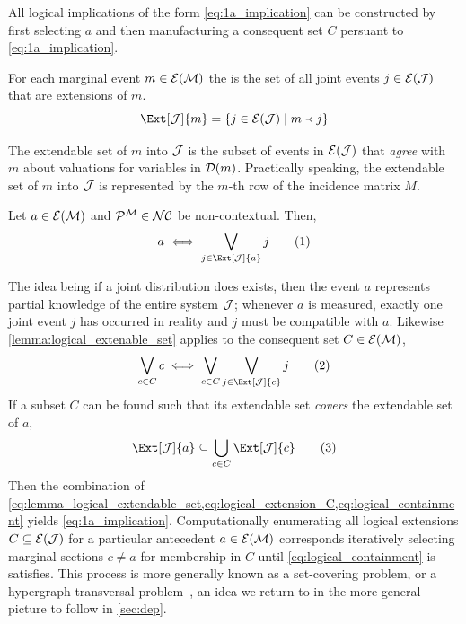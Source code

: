 \documentclass[aps, 10pt, english, twoside, pra, nofootinbib, longbibliography]{revtex4-1}
\begin{document}
    All logical implications of the form \cref{eq:1a_implication} can be constructed by first selecting $a$ and then manufacturing a consequent set $C$ persuant to \cref{eq:1a_implication}.

    \begin{definition}
        \label{def:extendable_set}
        For each marginal event $m \in \Events{\mscenario}$ the  is the set of all joint events $j \in \Events{\jointvar}$ that are extensions of $m$.
        \[ \Ext[\jointvar]{m} = \bc{j \in \Events{\jointvar} \mid m \ext j} \]
    \end{definition}

    The extendable set of $m$ into $\mathcal{J}$ is the subset of events in $\Events{\jointvar}$ that \textit{agree} with $m$ about valuations for variables in $\Dom{m}$. Practically speaking, the extendable set of $m$ into $\mathcal{J}$ is represented by the $m$-th row of the incidence matrix $M$.

    \begin{lemma}
        \label{lemma:logical_extenable_set}
        Let $a \in \Events{\mscenario}$ and $\probvec^{\mscenario} \in \s{NC}$ be non-contextual. Then,
        \[ a \iff \bigvee_{j \in \Ext[\jointvar]{a}} j \eq \label{eq:lemma_logical_extendable_set}\]
    \end{lemma}
    The idea being if a joint distribution does exists, then the event $a$ represents partial knowledge of the entire system $\mathcal{J}$; whenever $a$ is measured, exactly one joint event $j$ has occurred in reality and $j$ must be compatible with $a$. Likewise \cref{lemma:logical_extenable_set} applies to the consequent set $C \in \Events{\mscenario}$,
    \[ \bigvee_{c \in C} c \iff \bigvee_{c \in C} \bigvee_{j \in \Ext[\jointvar]{c}} j \eq \label{eq:logical_extension_C}\]
    If a subset $C$ can be found such that its extendable set \textit{covers} the extendable set of $a$,
    \[ \Ext[\jointvar]{a} \subseteq \bigcup_{c \in C} \Ext[\jointvar]{c} \eq \label{eq:logical_containment} \]
    Then the combination of \cref{eq:lemma_logical_extendable_set,eq:logical_extension_C,eq:logical_containment} yields \cref{eq:1a_implication}.  Computationally enumerating all logical extensions $C \subseteq \Events{\jointvar}$ for a particular antecedent $a \in \Events{\mscenario}$ corresponds iteratively selecting marginal sections $c \neq a$ for membership in $C$ until \cref{eq:logical_containment} is satisfies. This process is more generally known as a set-covering problem, or a hypergraph transversal problem~\cite{Inflation}, an idea we return to in the more general picture to follow in \cref{sec:dep}. \\
\end{document}

